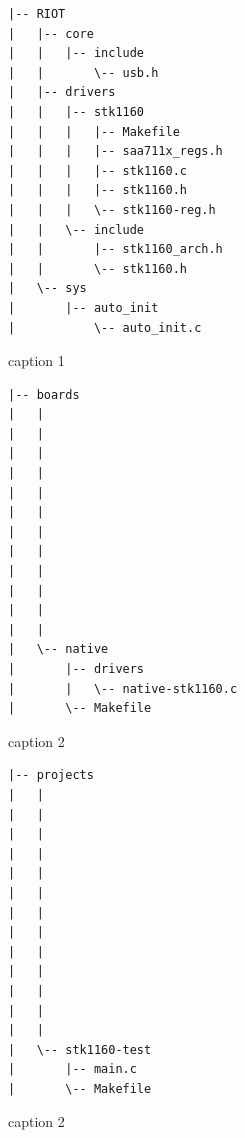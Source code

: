 \begin{landscape}
\begin{figure}[htbp]
  \centering
  \begin{minipage}[b]{9cm}
  \begin{verbatim}
|-- RIOT
|   |-- core
|   |   |-- include
|   |       \-- usb.h
|   |-- drivers
|   |   |-- stk1160
|   |   |   |-- Makefile
|   |   |   |-- saa711x_regs.h
|   |   |   |-- stk1160.c
|   |   |   |-- stk1160.h
|   |   |   \-- stk1160-reg.h
|   |   \-- include
|   |       |-- stk1160_arch.h
|   |       \-- stk1160.h
|   \-- sys
|       |-- auto_init
|           \-- auto_init.c
    \end{verbatim}
 
    \caption{caption 1}
    \label{fig:srcoverviewriot}
  \end{minipage}
  \begin{minipage}[b]{9cm}
    \begin{verbatim}
|-- boards
|   |
|   |
|   |
|   |
|   |
|   |
|   |
|   |
|   |
|   |
|   |
|   |
|   \-- native
|       |-- drivers
|       |   \-- native-stk1160.c
|       \-- Makefile
    \end{verbatim}
    \caption{caption 2}
    \label{fig:srcoverviewboards}
  \end{minipage}
  \begin{minipage}[b]{9cm}
    \begin{verbatim}
|-- projects
|   |
|   |
|   |
|   |
|   |
|   |
|   |
|   |
|   |
|   |
|   |
|   |
|   |
|   \-- stk1160-test
|       |-- main.c
|       \-- Makefile
    \end{verbatim}
    \caption{caption 2}
    \label{fig:srcoverviewprojects}
  \end{minipage}
  \end{figure}
\end{landscape}
\restoregeometry

